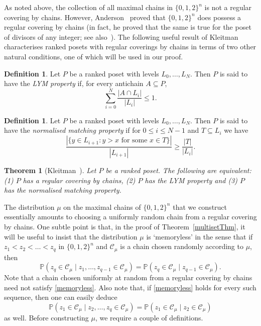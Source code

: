 \documentclass[11 pt]{article}
\newtheorem{thm}[equation]{Theorem}
\theoremstyle{definition}
\newtheorem{defn}[equation]{Definition}
\theoremstyle{case}
\numberwithin{equation}{section}
\begin{document}
As noted above,  the collection of all maximal chains in $\{0,1,2\}^n$ is not a regular covering by chains.  However, Anderson~\cite{Andersondivisors} proved that $\{0,1,2\}^n$ does possess a regular covering by chains (in fact, he proved that the same is true for the poset of divisors of any integer; see also~\cite{AndersonBook}). The following useful result of Kleitman~\cite{Kleitman} characterises ranked posets with regular coverings by chains in terms of two other natural conditions, one of which will be used in our proof. 

\begin{defn}
Let $P$ be a ranked poset with levels $L_0,\dots,L_N$. Then $P$ is said to have the \emph{LYM property} if, for every antichain $A\subseteq P$,
\[\sum_{i=0}^N\frac{|A\cap L_i|}{|L_i|}\leq 1.\]
\end{defn}

\begin{defn}
Let $P$ be a ranked poset with levels $L_0,\dots,L_N$. Then $P$ is said to have the \emph{normalised matching property} if for $0\leq i\leq N-1$ and $T\subseteq L_i$ we have
\[\frac{|\{y\in L_{i+1}: y>x \text{ for some }x\in T\}|}{|L_{i+1}|}\geq \frac{|T|}{|L_i|}.\]
\end{defn}

\begin{thm}[Kleitman~\cite{Kleitman}]
\label{Kequiv}
Let $P$ be a ranked poset. The following are equivalent: (1) $P$ has a regular covering by chains, (2) $P$ has the LYM property and (3) $P$ has the normalised matching property.
\end{thm}


The distribution $\mu$ on the maximal chains of $\{0,1,2\}^n$ that we construct essentially amounts to choosing a uniformly random chain from a regular covering by chains. One subtle point is that, in the proof of Theorem~\ref{multisetThm}, it will be useful to insist that the distribution $\mu$ is `memoryless' in the sense that
if $z_1<z_2<\dots<z_q$ in $\{0,1,2\}^n$ and $\mathcal{C}_\mu$ is a chain chosen randomly according to $\mu$, then
\begin{equation}\label{memoryless}\mathbb{P}\left(z_q\in\mathcal{C}_\mu\mid z_1,\dots,z_{q-1}\in\mathcal{C}_\mu\right)=\mathbb{P}\left(z_q\in\mathcal{C}_\mu\mid z_{q-1}\in\mathcal{C}_\mu\right).\end{equation}
Note that a chain chosen uniformly at random from a regular covering by chains need not satisfy \eqref{memoryless}. Also note that, if \eqref{memoryless} holds for every such sequence, then one can easily deduce
\[\mathbb{P}\left(z_1\in\mathcal{C}_\mu\mid z_2,\dots,z_{q}\in\mathcal{C}_\mu\right)=\mathbb{P}\left(z_1\in\mathcal{C}_\mu\mid z_{2}\in\mathcal{C}_\mu\right)\]
as well. Before constructing $\mu$, we require a couple of definitions.
\end{document}
